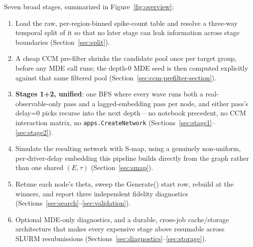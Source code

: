 \documentclass[11pt]{article}
\begin{document}
Seven broad stages, summarized in Figure~\ref{fig:overview}:
\begin{enumerate}[leftmargin=1.4em]
  \item Load the raw, per-region-binned spike-count table and resolve a three-way temporal split of it so that no later stage can leak information across stage boundaries (Section~\ref{sec:split}).
  \item A cheap CCM pre-filter shrinks the candidate pool once per target group, before any MDE call runs; the depth-0 MDE seed is then computed explicitly against that same filtered pool (Section~\ref{sec:ccm-prefilter-section}).
  \item \textbf{Stages 1+2, unified}: one BFS where every wave runs both a real-observable-only pass and a lagged-embedding pass per node, and either pass's delay=0 picks recurse into the next depth -- no notebook precedent, no CCM interaction matrix, no \texttt{apps.CreateNetwork} (Sections~\ref{sec:stage1}--\ref{sec:stage2}).
  \item Simulate the resulting network with S-map, using a genuinely non-uniform, per-driver-delay embedding this pipeline builds directly from the graph rather than one shared $(E,\tau)$ (Section~\ref{sec:smap}).
  \item Retune each node's theta, sweep the Generate() start row, rebuild at the winners, and report three independent fidelity diagnostics (Sections~\ref{sec:search}--\ref{sec:validation}).
  \item Optional MDE-only diagnostics, and a durable, cross-job cache/storage architecture that makes every expensive stage above resumable across SLURM resubmissions (Sections~\ref{sec:diagnostics}--\ref{sec:storage}).
\end{enumerate}
\end{document}
